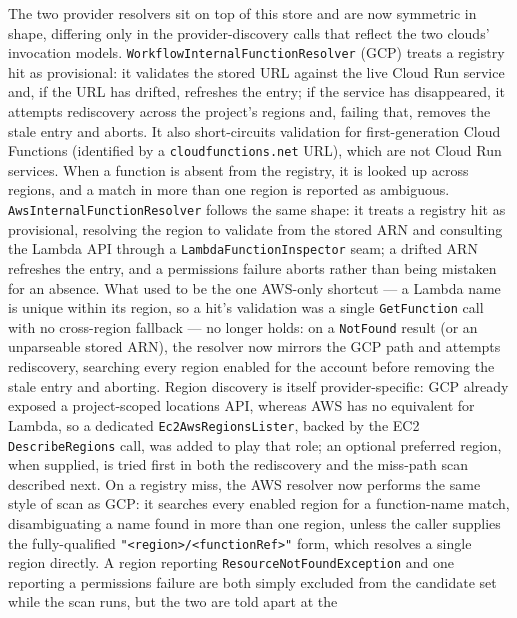 The two provider resolvers sit on top of this store and are now symmetric in shape, differing only
in the provider-discovery calls that reflect the two clouds' invocation models.
\texttt{Workflow\allowbreak Internal\allowbreak Function\allowbreak Resolver} (GCP) treats a registry hit as provisional: it
validates the stored URL against the live Cloud Run service and, if the URL has drifted, refreshes
the entry; if the service has disappeared, it attempts rediscovery across the project's regions
and, failing that, removes the stale entry and aborts. It also short-circuits validation for
first-generation Cloud Functions (identified by a \texttt{cloudfunctions.net} URL), which are not
Cloud Run services. When a function is absent from the registry, it is looked up across regions,
and a match in more than one region is reported as ambiguous.
\texttt{Aws\allowbreak Internal\allowbreak Function\allowbreak Resolver} follows the same shape: it treats a registry hit
as provisional, resolving the region to validate from the stored ARN and consulting the Lambda API
through a \texttt{Lambda\allowbreak Function\allowbreak Inspector} seam; a drifted ARN refreshes the entry, and a
permissions failure aborts rather than being mistaken for an absence. What used to be the one
AWS-only shortcut --- a Lambda name is unique within its region, so a hit's validation was a single
\texttt{GetFunction} call with no cross-region fallback --- no longer holds: on a \texttt{NotFound}
result (or an unparseable stored ARN), the resolver now mirrors the GCP path and attempts
rediscovery, searching every region enabled for the account before removing the stale entry and
aborting. Region discovery is itself provider-specific: GCP already exposed a project-scoped
locations API, whereas AWS has no equivalent for Lambda, so a dedicated
\texttt{Ec2Aws\allowbreak Regions\allowbreak Lister}, backed by the EC2 \texttt{DescribeRegions} call, was added to
play that role; an optional preferred region, when supplied, is tried first in both the
rediscovery and the miss-path scan described next. On a registry miss, the AWS resolver now performs
the same style of scan as GCP: it searches every enabled region for a function-name match,
disambiguating a name found in more than one region, unless the caller supplies the
fully-qualified \texttt{"<region>/<functionRef>"} form, which resolves a single region directly. A
region reporting \texttt{ResourceNotFoundException} and one reporting a permissions failure are
both simply excluded from the candidate set while the scan runs, but the two are told apart at the
